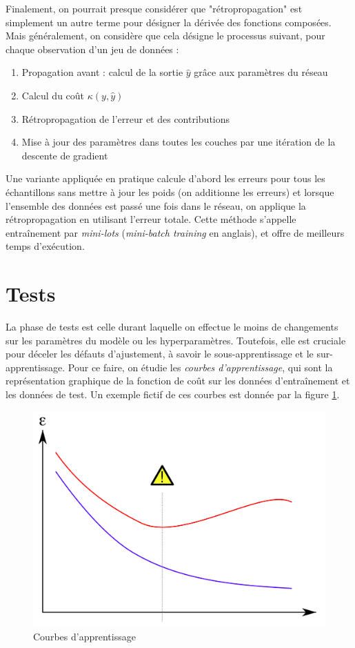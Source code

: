 Finalement, on pourrait presque considérer que "rétropropagation" est simplement un autre terme pour désigner la dérivée des fonctions composées. Mais généralement, on considère que cela désigne le processus suivant, pour chaque observation d'un jeu de données :
\begin{enumerate}
\item Propagation avant : calcul de la sortie \(\hat{y}\) grâce aux paramètres du réseau
\item Calcul du coût \(\kappa(y, \hat{y})\)
\item Rétropropagation de l'erreur et des contributions 
\item Mise à jour des paramètres dans toutes les couches par une itération de la descente de gradient
\end{enumerate}

Une variante appliquée en pratique calcule d'abord les erreurs pour tous les échantillons sans mettre à jour les poids (on additionne les erreurs) et lorsque l'ensemble des données est passé une fois dans le réseau, on applique la rétropropagation en utilisant l'erreur totale. Cette méthode s'appelle entraînement par \emph{mini-lots} (\emph{mini-batch training} en anglais), et offre de meilleurs temps d'exécution.


\section{Tests}
La phase de tests est celle durant laquelle on effectue le moins de changements sur les paramètres du modèle ou les hyperparamètres. Toutefois, elle est cruciale pour déceler les défauts d'ajustement, à savoir le sous-apprentissage et le sur-apprentissage. Pour ce faire, on étudie les \emph{courbes d'apprentissage}, qui sont la représentation graphique de la fonction de coût sur les données d'entraînement et les données de test. Un exemple fictif de ces courbes est donnée par la figure \ref{fig:courbes_apprent}. 

\begin{figure}[H]
\centering
\includegraphics[width=.5\textwidth]{img/courbes_apprent.png}
\caption{Courbes d'apprentissage}
\label{fig:courbes_apprent}
\end{figure}

